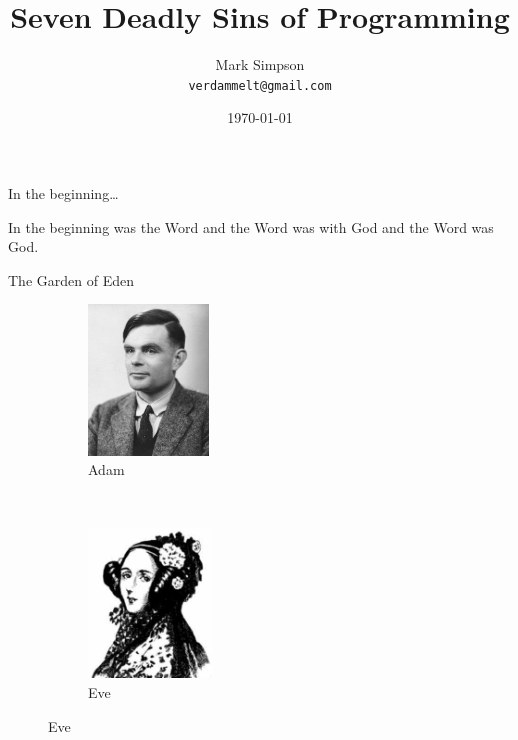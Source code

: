 \documentclass[12pt,xcolor=x11names]{beamer}
\title{Seven Deadly Sins of Programming}
\subtitle{}
\author{Mark Simpson \\ \texttt{verdammelt@gmail.com}}
\institute{Angst Programming IG}
\date{\today}
\begin{document}
\begin{frame}
    \titlepage
\end{frame}

\begin{frame}{In the beginning\ldots}

    In the beginning was the Word and the Word was with God and the Word was
    God.
    \pause
    
\end{frame}

\begin{frame}{The Garden of Eden}
    \begin{figure}
        \begin{subfigure}[b]{0.3\textwidth}
            \centering \includegraphics[height=4cm]{images/turing.jpg}
            \caption{Adam}
        \end{subfigure} 
        ~
        \begin{subfigure}[b]{0.3\textwidth}
            \centering \includegraphics[height=4cm]{images/lovelace.jpg}
            \caption{Eve}
        \end{subfigure}
    \end{figure}
\end{frame}
\end{document}
